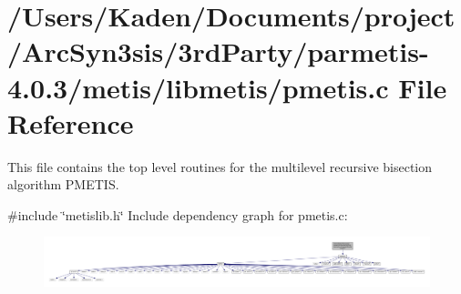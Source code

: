 \hypertarget{a00260}{}\section{/\+Users/\+Kaden/\+Documents/project/\+Arc\+Syn3sis/3rd\+Party/parmetis-\/4.0.3/metis/libmetis/pmetis.c File Reference}
\label{a00260}


This file contains the top level routines for the multilevel recursive bisection algorithm P\+M\+E\+T\+IS.  


{\ttfamily \#include \char`\"{}metislib.\+h\char`\"{}}\newline
Include dependency graph for pmetis.\+c\+:\nopagebreak
\begin{figure}[H]
\begin{center}
\leavevmode
\includegraphics[width=350pt]{a00261}
\end{center}
\end{figure}
